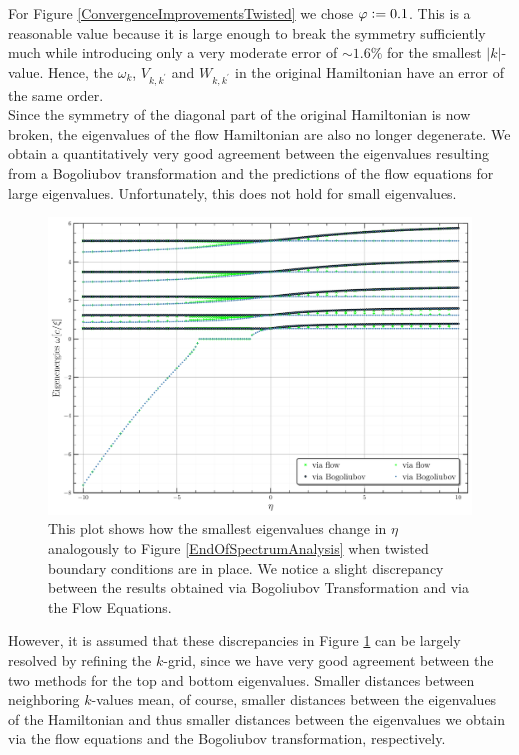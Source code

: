 For Figure \ref{ConvergenceImprovementsTwisted} we chose $\varphi\vcentcolon= 0.1$. This is a reasonable value because it is large enough to break the symmetry sufficiently much while introducing only a very moderate error of $\sim 1.6\%$ for the smallest $|k|$-value. Hence, the $\omega_k$, $V_{k,k^\prime}$ and $W_{k,k^\prime}$ in the original Hamiltonian have an error of the same order.\\
Since the symmetry of the diagonal part of the original Hamiltonian is now broken, the eigenvalues of the flow Hamiltonian are also no longer degenerate. We obtain a quantitatively very good agreement between the eigenvalues resulting from a Bogoliubov transformation and the predictions of the flow equations for large eigenvalues. Unfortunately, this does not hold for small eigenvalues.
\begin{figure}[H]
    \centering
    \includegraphics[width=\textwidth]{figures/plots/PDF/Spectral_analysis,N=40_beginning_of_spectrum.pdf}
    \caption[Beginning of the spectrum of the Hamiltonian with twisted boundary conditions]{This plot shows how the smallest eigenvalues change in $\eta$ analogously to Figure \ref{EndOfSpectrumAnalysis} when twisted boundary conditions are in place. We notice a slight discrepancy between the results obtained via Bogoliubov Transformation and via the Flow Equations.}
    \label{ConvergenceTwistedSmallEigenvalues}
\end{figure}
However, it is assumed that these discrepancies in Figure \ref{ConvergenceTwistedSmallEigenvalues} can be largely resolved by refining the $k$-grid, since we have very good agreement between the two methods for the top and bottom eigenvalues. Smaller distances between neighboring $k$-values mean, of course, smaller distances between the eigenvalues of the Hamiltonian and thus smaller distances between the eigenvalues we obtain via the flow equations and the Bogoliubov transformation, respectively.\\
